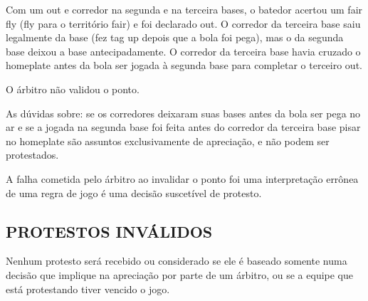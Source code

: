 \begin{exemplo}

	Com um \gls{out} e corredor na segunda e na terceira bases, o batedor acertou um \gls{fair fly} (\gls{fly} para o território \gls{fair}) e foi declarado \gls{out}. O corredor da terceira  base saiu legalmente da base (fez \gls{tag up} depois que a bola foi pega), mas o da segunda base deixou a base antecipadamente. O corredor da terceira base havia cruzado o \gls{homeplate} antes da bola ser jogada à segunda base para  completar o terceiro \gls{out}.

	O árbitro não validou o ponto.

	\vspace{3mm}
	As dúvidas sobre: se os corredores deixaram suas bases antes da bola ser pega no ar e se a jogada na  segunda base foi feita antes do corredor da terceira base pisar no \gls{homeplate} são assuntos exclusivamente de apreciação, e não podem ser protestados.

	\vspace{2mm}
	A  falha cometida pelo árbitro ao invalidar o ponto foi uma interpretação errônea de uma regra de jogo é uma decisão suscetível de protesto.

\end{exemplo}


\subsection{PROTESTOS INVÁLIDOS}
Nenhum protesto será recebido ou considerado se ele é baseado somente numa  decisão que implique na apreciação por parte de um árbitro, ou se a equipe que está protestando tiver vencido o jogo.

